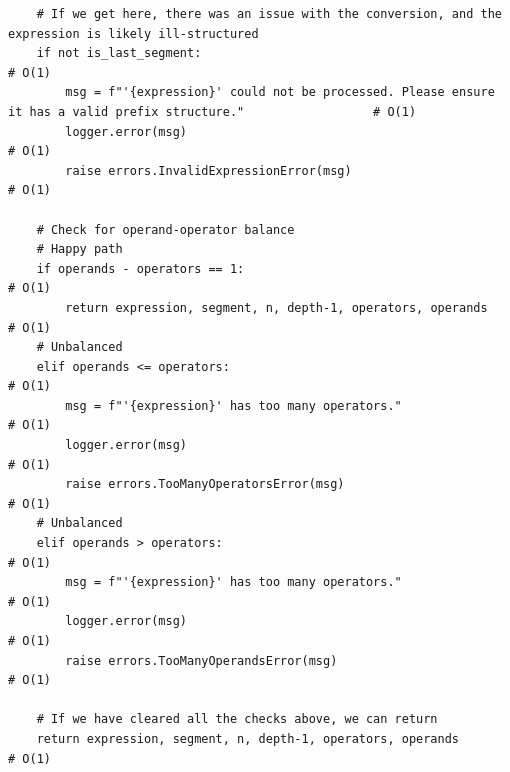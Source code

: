 \documentclass[10pt,letterpaper,final]{report}
\begin{document}
\begin{verbatim}
    # If we get here, there was an issue with the conversion, and the expression is likely ill-structured               
    if not is_last_segment:                                                                                             # O(1)
        msg = f"'{expression}' could not be processed. Please ensure it has a valid prefix structure."                  # O(1)
        logger.error(msg)                                                                                               # O(1)
        raise errors.InvalidExpressionError(msg)                                                                        # O(1)
                                                                                                                        
    # Check for operand-operator balance                                                                                
    # Happy path                                                                                                        
    if operands - operators == 1:                                                                                       # O(1)
        return expression, segment, n, depth-1, operators, operands                                                     # O(1)
    # Unbalanced                                                                                                        
    elif operands <= operators:                                                                                         # O(1)
        msg = f"'{expression}' has too many operators."                                                                 # O(1)
        logger.error(msg)                                                                                               # O(1)
        raise errors.TooManyOperatorsError(msg)                                                                         # O(1)
    # Unbalanced                                                                                                        
    elif operands > operators:                                                                                          # O(1)
        msg = f"'{expression}' has too many operators."                                                                 # O(1)
        logger.error(msg)                                                                                               # O(1)
        raise errors.TooManyOperandsError(msg)                                                                          # O(1)
                                                                                                                        
    # If we have cleared all the checks above, we can return                                                            
    return expression, segment, n, depth-1, operators, operands                                                         # O(1)
\end{verbatim}
\end{document}
